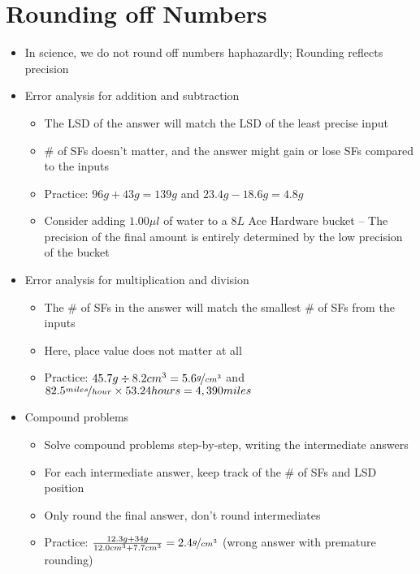 \documentclass[12pt, openany, letterpaper]{memoir}
\begin{document}
\section{Rounding off Numbers}
\begin{itemize}
	\item In science, we do not round off numbers haphazardly; Rounding reflects precision
	\item Error analysis for addition and subtraction
	      \begin{itemize}
		      \item The LSD of the answer will match the LSD of the least precise input
		      \item \# of SFs doesn't matter, and the answer might gain or lose SFs compared to the inputs
		      \item Practice: $96g+43g=139g$ \hspace{1em}and\hspace{1em} $23.4g-18.6g=4.8g$
		      \item Consider adding $1.00\mu l$ of water to a $8L$ Ace Hardware bucket -- The precision of the final amount is entirely determined by the low precision of the bucket
	      \end{itemize}
	\item Error analysis for multiplication and division
	      \begin{itemize}
		      \item The \# of SFs in the answer will match the smallest \# of SFs from the inputs
		      \item Here, place value does not matter at all
		      \item Practice: $45.7g \div 8.2cm^3 = 5.6\nicefrac{g}{cm^3}$ \hspace{1em}and\hspace{1em} $82.5\nicefrac{miles}{hour}\times53.24hours=4,390miles$
	      \end{itemize}
	\item Compound problems
	      \begin{itemize}
		      \item Solve compound problems step-by-step, writing the intermediate answers
		      \item For each intermediate answer, keep track of the \# of SFs and LSD position
		      \item Only round the final answer, don't round intermediates
		      \item Practice: $\frac{12.3g+34g}{12.0cm^3+7.7cm^3}=2.4\nicefrac{g}{cm^3}$ (wrong answer with premature rounding)
	      \end{itemize}
\end{itemize}
\end{document}
